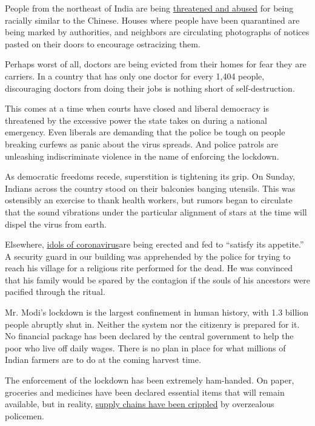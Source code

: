 People from the northeast of India are being
\href{https://www.indiatoday.in/india/story/coronavirus-outbreak-in-india-northeast-racial-targeting-delhi-1657276-2020-03-19}{threatened
and abused} for being racially similar to the Chinese. Houses where
people have been quarantined are being marked by authorities, and
neighbors are circulating photographs of notices pasted on their doors
to encourage ostracizing them.

Perhaps worst of all, doctors are being evicted from their homes for
fear they are carriers. In a country that has only one doctor for every
1,404 people, discouraging doctors from doing their jobs is nothing
short of self-destruction.

This comes at a time when courts have closed and liberal democracy is
threatened by the excessive power the state takes on during a national
emergency. Even liberals are demanding that the police be tough on
people breaking curfews as panic about the virus spreads. And police
patrols are unleashing indiscriminate violence in the name of enforcing
the lockdown.

As democratic freedoms recede, superstition is tightening its grip. On
Sunday, Indians across the country stood on their balconies banging
utensils. This was ostensibly an exercise to thank health workers, but
rumors began to circulate that the sound vibrations under the particular
alignment of stars at the time will dispel the virus from earth.

Elsewhere,
\href{https://www.moneycontrol.com/news/india/create-an-idol-of-corona-seek-forgiveness-hindu-mahasabha-chief-advises-xi-jinping-4951821.html}{idols
of coronavirus}are being erected and fed to ``satisfy its appetite.'' A
security guard in our building was apprehended by the police for trying
to reach his village for a religious rite performed for the dead. He was
convinced that his family would be spared by the contagion if the souls
of his ancestors were pacified through the ritual.

Mr. Modi's lockdown is the largest confinement in human history, with
1.3 billion people abruptly shut in. Neither the system nor the
citizenry is prepared for it. No financial package has been declared by
the central government to help the poor who live off daily wages. There
is no plan in place for what millions of Indian farmers are to do at the
coming harvest time.

The enforcement of the lockdown has been extremely ham-handed. On paper,
groceries and medicines have been declared essential items that will
remain available, but in reality,
\href{https://scroll.in/article/957222/coronavirus-on-day-1-of-nationwide-lockdown-complaints-about-supply-bottlenecks-from-across-india}{supply
chains have been crippled} by overzealous policemen.

